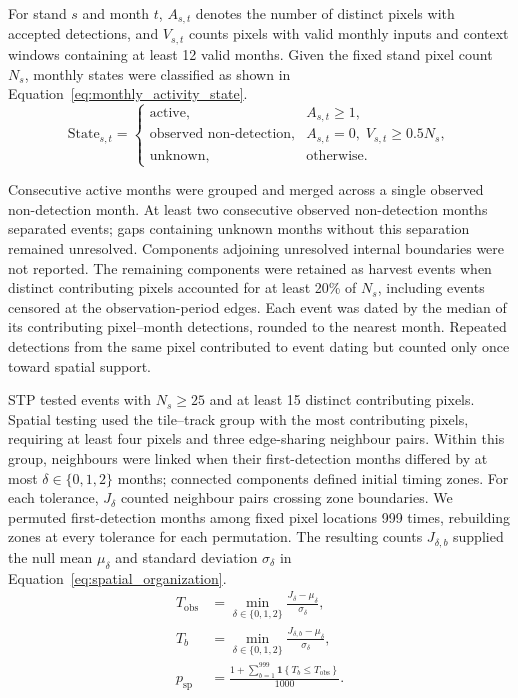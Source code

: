For stand $s$ and month $t$, $A_{s,t}$ denotes the number of distinct pixels with accepted detections, and $V_{s,t}$ counts pixels with valid monthly inputs and context windows containing at least 12 valid months. Given the fixed stand pixel count $N_s$, monthly states were classified as shown in Equation~\eqref{eq:monthly_activity_state}.
\begin{equation}
    \mathrm{State}_{s,t} =
    \begin{cases}
        \text{active}, & A_{s,t}\geq 1,\\
        \text{observed non-detection}, & A_{s,t}=0,\; V_{s,t}\geq 0.5N_s,\\
        \text{unknown}, & \text{otherwise}.
    \end{cases}
    \label{eq:monthly_activity_state}
\end{equation}

Consecutive active months were grouped and merged across a single observed non-detection month. At least two consecutive observed non-detection months separated events; gaps containing unknown months without this separation remained unresolved. Components adjoining unresolved internal boundaries were not reported. The remaining components were retained as harvest events when distinct contributing pixels accounted for at least 20\% of $N_s$, including events censored at the observation-period edges. Each event was dated by the median of its contributing pixel--month detections, rounded to the nearest month. Repeated detections from the same pixel contributed to event dating but counted only once toward spatial support.

STP tested events with $N_s\geq25$ and at least 15 distinct contributing pixels. Spatial testing used the tile--track group with the most contributing pixels, requiring at least four pixels and three edge-sharing neighbour pairs. Within this group, neighbours were linked when their first-detection months differed by at most $\delta\in\{0,1,2\}$ months; connected components defined initial timing zones. For each tolerance, $J_\delta$ counted neighbour pairs crossing zone boundaries. We permuted first-detection months among fixed pixel locations 999 times, rebuilding zones at every tolerance for each permutation. The resulting counts $J_{\delta,b}$ supplied the null mean $\mu_\delta$ and standard deviation $\sigma_\delta$ in Equation~\eqref{eq:spatial_organization}.
\begin{equation}
    \begin{aligned}
        T_{\mathrm{obs}} &= \min_{\delta\in\{0,1,2\}} \frac{J_\delta-\mu_\delta}{\sigma_\delta},\\
        T_b &= \min_{\delta\in\{0,1,2\}} \frac{J_{\delta,b}-\mu_\delta}{\sigma_\delta},\\
        p_{\mathrm{sp}} &= \frac{1+\sum_{b=1}^{999}\mathbf{1}\!\left\{T_b\leq T_{\mathrm{obs}}\right\}}{1000}.
    \end{aligned}
    \label{eq:spatial_organization}
\end{equation}

